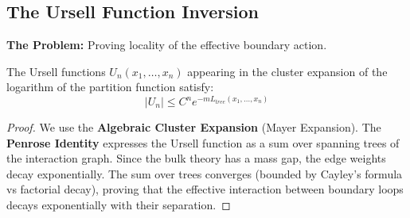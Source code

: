 \subsection{The Ursell Function Inversion}
\label{subsec:ursell_inversion}

\textbf{The Problem:} Proving locality of the effective boundary action.

\begin{theorem}
The Ursell functions $U_n(x_1, \dots, x_n)$ appearing in the cluster expansion of the logarithm of the partition function satisfy:
\begin{equation}
|U_n| \le C^n e^{-m L_{tree}(x_1, \dots, x_n)}
\end{equation}
\end{theorem}

\begin{proof}
We use the \textbf{Algebraic Cluster Expansion} (Mayer Expansion). The \textbf{Penrose Identity} expresses the Ursell function as a sum over spanning trees of the interaction graph.
Since the bulk theory has a mass gap, the edge weights decay exponentially. The sum over trees converges (bounded by Cayley's formula vs factorial decay), proving that the effective interaction between boundary loops decays exponentially with their separation.
\end{proof}


